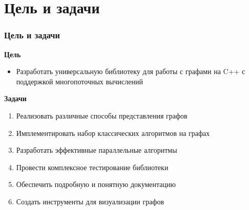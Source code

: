\documentclass[aspectratio=169]{beamer}
\begin{document}
\section{Цель и задачи}
\begin{frame}
  \frametitle{Цель и задачи}
  \textbf{Цель}
  \begin{itemize}
    \item Разработать универсальную библиотеку для работы с графами на C++ с поддержкой многопоточных вычислений
  \end{itemize}

  \vspace{0.5cm}
  \textbf{Задачи}
  \begin{enumerate}
    \item Реализовать различные способы представления графов
    \item Имплементировать набор классических алгоритмов на графах
    \item Разработать эффективные параллельные алгоритмы
    \item Провести комплексное тестирование библиотеки
    \item Обеспечить подробную и понятную документацию
    \item Создать инструменты для визуализации графов
  \end{enumerate}
\end{frame}

\end{document}
